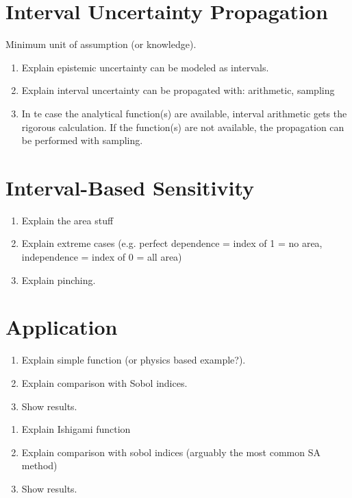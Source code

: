 \documentclass[twocolumn]{rps-esrl2020}
\begin{document}
\section{Interval Uncertainty Propagation}

Minimum unit of assumption (or knowledge).

\begin{enumerate}
	\item Explain epistemic uncertainty can be modeled as intervals.
	\item Explain interval uncertainty can be propagated with: arithmetic, sampling
	\item In te case the analytical function(s) are available, interval arithmetic gets the rigorous calculation.
	If the function(s) are not available, the propagation can be performed with sampling.
\end{enumerate}

\section{Interval-Based Sensitivity}

\begin{enumerate}
	\item Explain the area stuff
	\item Explain extreme cases (e.g. perfect dependence = index of 1 = no area, independence = index of 0 = all area)
	\item Explain pinching.
\end{enumerate}

\section{Application}

\begin{enumerate}
	\item Explain simple function (or physics based example?).
	\item Explain comparison with Sobol indices.
	\item Show results.
\end{enumerate}

\begin{enumerate}
	\item Explain Ishigami function
	\item Explain comparison with sobol indices (arguably the most common SA method)
	\item Show results.
\end{enumerate}
\end{document}

